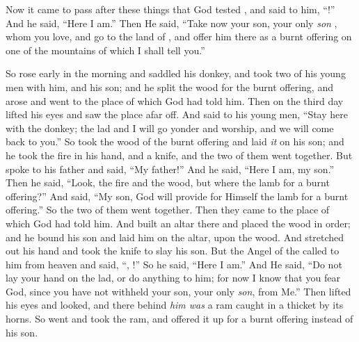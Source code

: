 
\bverse Now it came to pass after these things that God tested \Abraham, and said to him, ``\Abraham!'' And he said, ``Here I am.''
\bverse Then He said, ``Take now your son, your only \textit{son} \Isaac, whom you love, and go to the land of , and offer him there as a burnt offering on one of the mountains of which I shall tell you.''

\bverse So \Abraham rose early in the morning and saddled his donkey, and took two of his young men with him, and \Isaac his son; and he split the wood for the burnt offering, and arose and went to the place of which God had told him.
\bverse Then on the third day \Abraham lifted his eyes and saw the place afar off.
\bverse And \Abraham said to his young men, ``Stay here with the donkey; the lad and I will go yonder and worship, and we will come back to you.''
\bverse So \Abraham took the wood of the burnt offering and laid \textit{it} on \Isaac his son; and he took the fire in his hand, and a knife, and the two of them went together.
\bverse But \Isaac spoke to \Abraham his father and said, ``My father!'' And he said, ``Here I am, my son.'' Then he said, ``Look, the fire and the wood, but where \is the lamb for a burnt offering?''
\bverse And \Abraham said, ``My son, God will provide for Himself the lamb for a burnt offering.'' So the two of them went together.
\bverse Then they came to the place of which God had told him. And \Abraham built an altar there and placed the wood in order; and he bound \Isaac his son and laid him on the altar, upon the wood.
\bverse And \Abraham stretched out his hand and took the knife to slay his son.
\bverse But the Angel of the \lord called to him from heaven and said, ``\Abraham, \Abraham!'' So he said, ``Here I am.''
\bverse And He said, ``Do not lay your hand on the lad, or do anything to him; for now I know that you fear God, since you have not withheld your son, your only \textit{son}, from Me.''
\bverse Then \Abraham lifted his eyes and looked, and there behind \textit{him was} a ram caught in a thicket by its horns. So \Abraham went and took the ram, and offered it up for a burnt offering instead of his son. 
